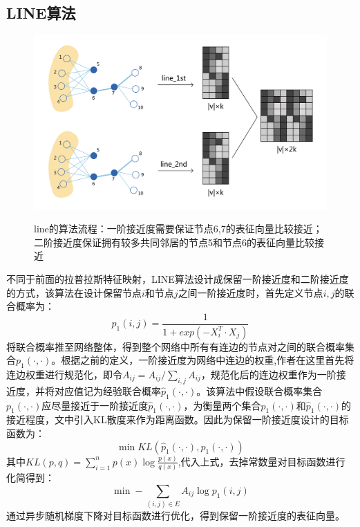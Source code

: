 \subsection{LINE算法}
 \begin{figure}[!ht]
	\centering
	{\includegraphics[width=5in]{figures/line.png}}
	\caption{line的算法流程：一阶接近度需要保证节点6,7的表征向量比较接近；二阶接近度保证拥有较多共同邻居的节点5和节点6的表征向量比较接近}\label{line_process}
\end{figure}
 不同于前面的拉普拉斯特征映射，LINE算法设计成保留一阶接近度和二阶接近度的方式，该算法在设计保留节点$i$和节点$j$之间一阶接近度时，首先定义节点$i,j$的联合概率为：
 \begin{equation}
 p_1(i,j) = \frac{1}{1+exp(-X_i^T \cdot X_j)}
 \end{equation}
 将联合概率推至网络整体，得到整个网络中所有有连边的节点对之间的联合概率集合$p_1(\cdot,\cdot)$。根据之前的定义，一阶接近度为网络中连边的权重,作者在这里首先将连边权重进行规范化，即令$A_{ij} =A_{ij}/\sum_{i,j}A_{ij} $，规范化后的连边权重作为一阶接近度，并将对应值记为经验联合概率$\hat{p}_1(\cdot,\cdot)$。该算法中假设联合概率集合$p_1(\cdot,\cdot)$应尽量接近于一阶接近度$\hat{p}_1(\cdot,\cdot)$，为衡量两个集合$p_1(\cdot, \cdot)$和$\hat{p}_1(\cdot,\cdot)$的接近程度，文中引入KL散度来作为距离函数。因此为保留一阶接近度设计的目标函数为：
 \begin{equation}
 	\min KL(\hat{p}_1(\cdot, \cdot),p_1(\cdot,\cdot))
 \end{equation}
 其中$KL(p,q) = \sum_{i=1}^{n}p(x)\log\frac{p(x)}{q(x)}$,代入上式，去掉常数量对目标函数进行化简得到：
 \begin{equation}\label{line_1st}
 	\min -\sum_{(i,j) \in E} A_{ij}\log p_1(i,j)
 \end{equation}
 通过异步随机梯度下降对目标函数进行优化，得到保留一阶接近度的表征向量。
 
